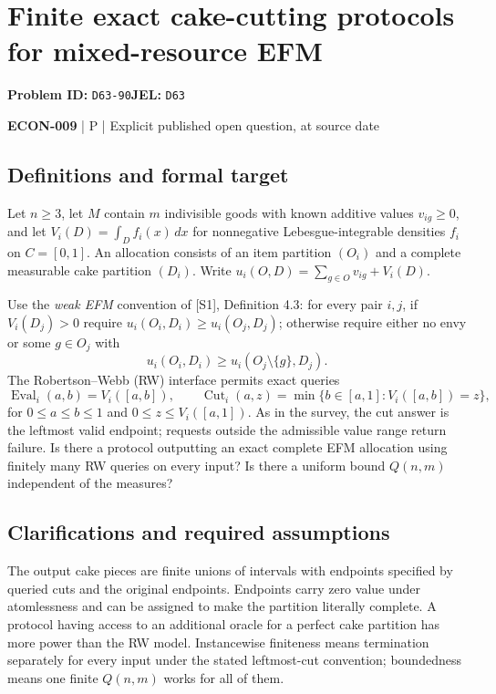 \documentclass[11pt,a4paper]{article}
\begin{document}
\section*{Finite exact cake-cutting protocols for mixed-resource EFM}
\textbf{Problem ID:} \texttt{D63-90}\quad \textbf{JEL:} \texttt{D63}\par
\label{problem:OP-0595}


\label{audited:ECON-009}

{\sffamily\small\color{muted}\textbf{ECON-009} | P | Explicit published open question, at source date\par}

\subsection*{Definitions and formal target}

Let $n\geq3$, let $M$ contain $m$ indivisible goods with known additive values $v_{ig}\geq0$, and let $V_i(D)=\int_D f_i(x)\,dx$ for nonnegative Lebesgue-integrable densities $f_i$ on $C=[0,1]$. An allocation consists of an item partition $(O_i)$ and a complete measurable cake partition $(D_i)$. Write $u_i(O,D)=\sum_{g\in O}v_{ig}+V_i(D)$.

Use the \emph{weak EFM} convention of [S1], Definition 4.3: for every pair $i,j$, if $V_i(D_j)>0$ require $u_i(O_i,D_i)\geq u_i(O_j,D_j)$; otherwise require either no envy or some $g\in O_j$ with
\[
u_i(O_i,D_i)\geq u_i(O_j\setminus\{g\},D_j).
\]
The Robertson--Webb (RW) interface permits exact queries
\[
\operatorname{Eval}_i(a,b)=V_i([a,b]),\qquad
\operatorname{Cut}_i(a,z)=\min\{b\in[a,1]:V_i([a,b])=z\},
\]
for $0\leq a\leq b\leq1$ and $0\leq z\leq V_i([a,1])$. As in the survey, the cut answer is the leftmost valid endpoint; requests outside the admissible value range return failure. Is there a protocol outputting an exact complete EFM allocation using finitely many RW queries on every input? Is there a uniform bound $Q(n,m)$ independent of the measures?

\subsection*{Clarifications and required assumptions}

The output cake pieces are finite unions of intervals with endpoints specified by queried cuts and the original endpoints. Endpoints carry zero value under atomlessness and can be assigned to make the partition literally complete. A protocol having access to an additional oracle for a perfect cake partition has more power than the RW model. Instancewise finiteness means termination separately for every input under the stated leftmost-cut convention; boundedness means one finite $Q(n,m)$ works for all of them.
\end{document}
